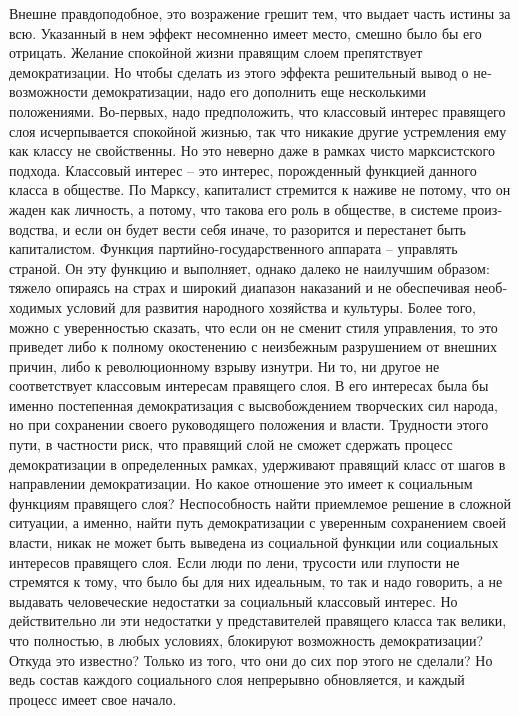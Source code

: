 \documentclass{book}
\begin{document}
Внешне правдоподобное, это возражение грешит тем, что вы­дает часть истины за всю. Указанный в нем эффект несомнен­но имеет место, смешно было бы его отрицать. Желание спо­койной жизни правящим слоем препятствует демократизации. Но чтобы сделать из этого эффекта решительный вывод о не­возможности демократизации, надо его дополнить еще несколь­кими положениями. Во-первых, надо предположить, что клас­совый интерес правящего слоя исчерпывается спокойной жиз­нью, так что никакие другие устремления ему как классу не свойственны. Но это неверно даже в рамках чисто марксистско­го подхода. Классовый интерес -- это интерес, порожденный функцией  данного класса в обществе. По Марксу, капиталист стремится к наживе не потому, что он жаден как личность, а потому, что такова его роль в обществе, в системе произ­водства, и если он будет вести себя иначе, то разорится и пере­станет быть капиталистом. Функция партийно-государственно­го аппарата -- управлять страной. Он эту функцию и выполняет, однако далеко не наилучшим 
образом: тяжело опираясь на страх и широкий диапазон наказаний и не обеспечивая необ­ходимых условий для развития народного хозяйства и куль­туры. Более того, можно с уверенностью сказать, что если он не сменит стиля управления, то это приведет либо к полному окостенению с неизбежным разрушением от внешних причин, либо к революционному взрыву изнутри. Ни то, ни другое не соответствует классовым интересам правящего слоя. В его интересах была бы именно постепенная демократизация с вы­свобождением творческих сил народа, но при сохранении свое­го руководящего положения и власти. Трудности этого пути, в частности риск, что правящий слой не сможет сдержать про­цесс демократизации в определенных рамках, удерживают пра­вящий класс от шагов в направлении демократизации. Но какое отношение это имеет к социальным функциям  правящего слоя? Неспособность найти приемлемое решение в сложной ситуации, а именно, найти путь демократизации с уверенным сохранением своей власти, никак не может быть выведена из со­циальной 
функции или социальных интересов правящего слоя. Если люди по лени, трусости или глупости не стремятся к тому, что было бы для них идеальным, то так и надо говорить, а не выдавать человеческие недостатки за социальный классовый интерес. Но действительно ли эти недостатки у представите­лей правящего класса так велики, что полностью, в любых условиях, блокируют возможность демократизации? Откуда это известно? Только из того, что они до сих пор этого не сде­лали? Но ведь состав каждого социального слоя непрерывно обновляется, и каждый процесс имеет свое начало.
\end{document}
